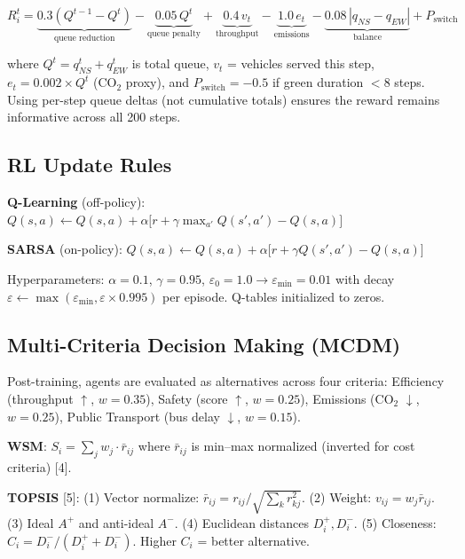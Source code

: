 \documentclass[11pt, a4paper]{article}
\begin{document}
\begin{equation}
\boxed{
    R_i^t = \underbrace{0.3(Q^{t-1} - Q^t)}_{\text{queue reduction}} - \underbrace{0.05\, Q^t}_{\text{queue penalty}} + \underbrace{0.4\, v_t}_{\text{throughput}} - \underbrace{1.0\, e_t}_{\text{emissions}} - \underbrace{0.08\, |q_{NS} - q_{EW}|}_{\text{balance}} + P_{\text{switch}}
}
\end{equation}

where $Q^t = q_{NS}^t + q_{EW}^t$ is total queue, $v_t$ = vehicles served this step, $e_t = 0.002 \times Q^t$ (CO$_2$ proxy), and $P_{\text{switch}} = -0.5$ if green duration $< 8$ steps. Using per-step queue deltas (not cumulative totals) ensures the reward remains informative across all 200 steps.

\subsection{RL Update Rules}

\textbf{Q-Learning} (off-policy): $Q(s,a) \leftarrow Q(s,a) + \alpha \big[ r + \gamma \max_{a'} Q(s', a') - Q(s,a) \big]$

\textbf{SARSA} (on-policy): $Q(s,a) \leftarrow Q(s,a) + \alpha \big[ r + \gamma Q(s', a') - Q(s,a) \big]$

Hyperparameters: $\alpha = 0.1$, $\gamma = 0.95$, $\varepsilon_0 = 1.0 \to \varepsilon_{\min} = 0.01$ with decay $\varepsilon \leftarrow \max(\varepsilon_{\min}, \varepsilon \times 0.995)$ per episode. Q-tables initialized to zeros.

\subsection{Multi-Criteria Decision Making (MCDM)}

Post-training, agents are evaluated as alternatives across four criteria: Efficiency (throughput $\uparrow$, $w=0.35$), Safety (score $\uparrow$, $w=0.25$), Emissions (CO$_2$ $\downarrow$, $w=0.25$), Public Transport (bus delay $\downarrow$, $w=0.15$).

\textbf{WSM}: $S_i = \sum_j w_j \cdot \bar{r}_{ij}$ where $\bar{r}_{ij}$ is min--max normalized (inverted for cost criteria) [4].

\textbf{TOPSIS} [5]: (1) Vector normalize: $\bar{r}_{ij} = r_{ij} / \sqrt{\sum_k r_{kj}^2}$. (2) Weight: $v_{ij} = w_j \bar{r}_{ij}$. (3) Ideal $A^+$ and anti-ideal $A^-$. (4) Euclidean distances $D_i^+, D_i^-$. (5) Closeness: $C_i = D_i^- / (D_i^+ + D_i^-)$. Higher $C_i$ = better alternative.
\end{document}
